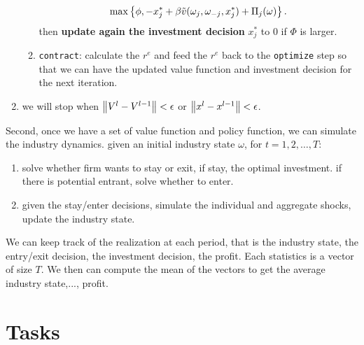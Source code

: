 \documentclass[12pt]{article}[margin=1in]
\begin{document}
\begin{enumerate}
\begin{enumerate}
                    \begin{equation*}
                        \max\left\{\phi, -x_j^*+\beta\tilde{v}(\omega_j, \omega_{-j}, x_j^*)+\Pi_j(\omega)\right\}.
                    \end{equation*}
                    then \textbf{update again the investment decision} $x_j^*$ to $0$ if $\Phi$ is larger.
              \item \verb|contract|: calculate the $r^e$ and feed the $r^e$ back to the \verb|optimize| step so that we can have the updated value function and investment decision for the next iteration.
          \end{enumerate}
    \item we will stop when $\left\| V^{l}-V^{l-1} \right\|<\epsilon$ or $\left\| x^{l}-x^{l-1} \right\|<\epsilon$.
\end{enumerate}

Second, once we have a set of value function and policy function, we can simulate the industry dynamics.
given an initial industry state $\omega$, for $t=1,2,\ldots,T$:
\begin{enumerate}
    \item solve whether firm wants to stay or exit, if stay, the optimal investment. if there is potential entrant, solve whether to enter.
    \item given the stay/enter decisions, simulate the individual and aggregate shocks, update the industry state.
\end{enumerate}
We can keep track of the realization at each period, that is the industry state, the entry/exit decision, the investment decision, the profit. Each statistics is a vector of size $T$. We then can compute the mean of the vectors to get the average industry state,..., profit.


\section{Tasks}

\newpage

\end{document}
